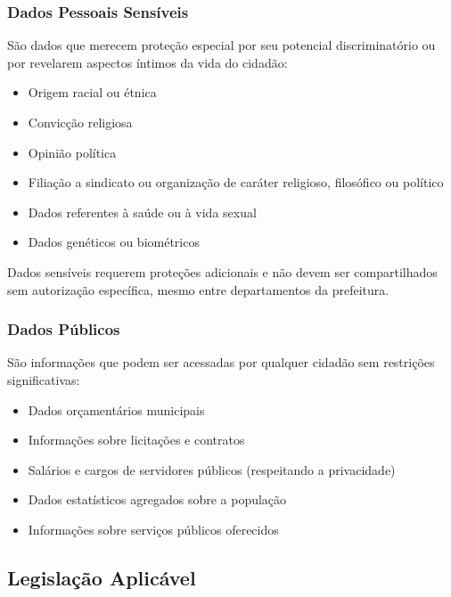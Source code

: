 \documentclass[12pt,a4paper]{article}
\begin{document}
\subsubsection{Dados Pessoais Sensíveis}
São dados que merecem proteção especial por seu potencial discriminatório ou por revelarem aspectos íntimos da vida do cidadão:
\begin{itemize}
    \item Origem racial ou étnica
    \item Convicção religiosa
    \item Opinião política
    \item Filiação a sindicato ou organização de caráter religioso, filosófico ou político
    \item Dados referentes à saúde ou à vida sexual
    \item Dados genéticos ou biométricos
\end{itemize}

\begin{tcolorbox}[colback=vermelhoclaro, colframe=red!75!black, title=Atenção!]
Dados sensíveis requerem proteções adicionais e não devem ser compartilhados sem autorização específica, mesmo entre departamentos da prefeitura.
\end{tcolorbox}

\subsubsection{Dados Públicos}
São informações que podem ser acessadas por qualquer cidadão sem restrições significativas:
\begin{itemize}
    \item Dados orçamentários municipais
    \item Informações sobre licitações e contratos
    \item Salários e cargos de servidores públicos (respeitando a privacidade)
    \item Dados estatísticos agregados sobre a população
    \item Informações sobre serviços públicos oferecidos
\end{itemize}

\subsection{Legislação Aplicável}
\end{document}
